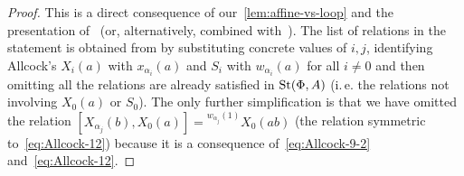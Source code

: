 \begin{proof}
    This is a direct consequence of our~\cref{lem:affine-vs-loop} and the presentation of~\cite[Theorem~1]{A16} (or, alternatively, \cite[Theorem~1.1]{A13} combined with~\cite[Theorem~1.3]{A13}).
    The list of relations in the statement is obtained from \cite[Table~1]{A16} by substituting concrete values of $i, j$, identifying Allcock's $X_{i}(a)$ with
     $x_{\alpha_i}(a)$ and $S_i$ with $w_{\alpha_i}(a)$ for all $i\neq 0$ and then omitting all the relations are already satisfied in $\operatorname{St}(\Phi, A)$ (i.\,e. the relations not involving $X_0(a)$ or $S_0$).
    The only further simplification is that we have omitted the relation $[X_{\alpha_j}(b), X_0(a)] = {}^{w_{\alpha_j}(1)} X_0(ab)$ (the relation symmetric to~\eqref{eq:Allcock-12})
    because it is a consequence of~\eqref{eq:Allcock-9-2} and~\eqref{eq:Allcock-12}.
\end{proof}


